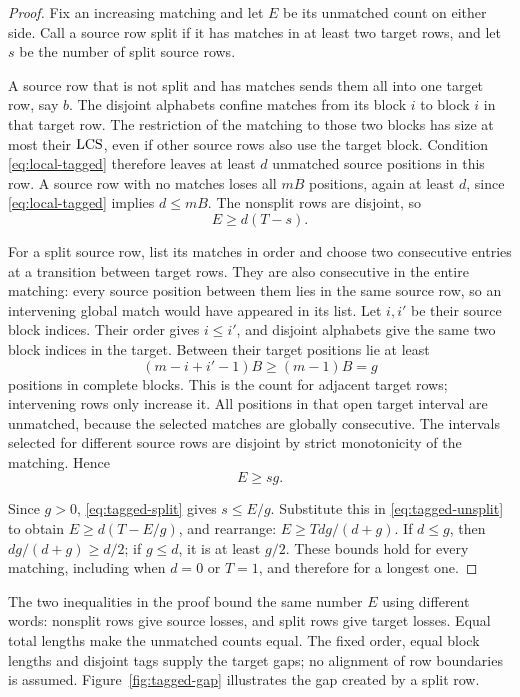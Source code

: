 \begin{proof}
Fix an increasing matching and let $E$ be its unmatched count on either
side. Call a source row split if it has matches in at least two target
rows, and let $s$ be the number of split source rows.

A source row that is not split and has matches sends them all into one
target row, say $b$. The disjoint alphabets confine matches from its
block $i$ to block $i$ in that target row. The restriction of the
matching to those two blocks has size at most their $\operatorname{LCS}$, even if
other source rows also use the target block. Condition
\eqref{eq:local-tagged} therefore leaves at least $d$ unmatched source
positions in this row. A source row with no matches loses all $mB$
positions, again at least $d$, since \eqref{eq:local-tagged} implies
$d\leq mB$. The nonsplit rows are disjoint, so
\begin{equation}\label{eq:tagged-unsplit}
 E\geq d(T-s).
\end{equation}

For a split source row, list its matches in order and choose two
consecutive entries at a transition between target rows. They are also
consecutive in the entire matching: every source position between them
lies in the same source row, so an intervening global match would have
appeared in its list. Let $i,i'$ be their source block indices. Their
order gives $i\leq i'$, and disjoint alphabets give the same two block
indices in the target. Between their target positions lie at least
\[
 (m-i+i'-1)B\geq(m-1)B=g
\]
positions in complete blocks. This is the count for adjacent target
rows; intervening rows only increase it. All positions in that open
target interval are unmatched, because the selected matches are
globally consecutive. The intervals selected for different source rows
are disjoint by strict monotonicity of the matching. Hence
\begin{equation}\label{eq:tagged-split}
 E\geq sg.
\end{equation}

Since $g>0$, \eqref{eq:tagged-split} gives $s\leq E/g$. Substitute this
in \eqref{eq:tagged-unsplit} to obtain
$E\geq d(T-E/g)$, and rearrange:
$E\geq Tdg/(d+g)$. If $d\leq g$, then $dg/(d+g)\geq d/2$; if
$g\leq d$, it is at least $g/2$. These bounds hold for every matching,
including when $d=0$ or $T=1$, and therefore for a longest one.
\end{proof}

The two inequalities in the proof bound the same number $E$ using
different words: nonsplit rows give source losses, and split rows give
target losses. Equal total lengths make the unmatched counts equal.
The fixed order, equal block lengths and disjoint tags supply the
target gaps; no alignment of row boundaries is assumed.
Figure~\ref{fig:tagged-gap} illustrates the gap created by a split row.

